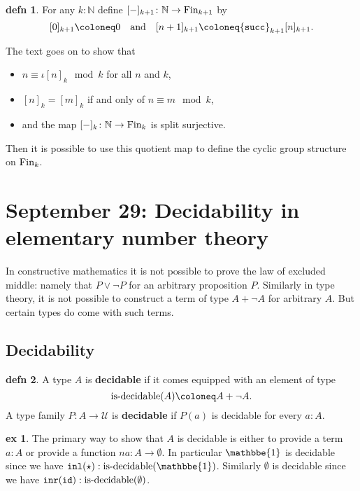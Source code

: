 \documentclass{amsart}
\theoremstyle{theorem}
\theoremstyle{definition}
\newtheorem*{defn}{defn}
\newtheorem*{ex}{ex}
\theoremstyle{remark}
\newcommand{\0}{\mathbbe{0}}
\newcommand{\1}{\mathbbe{1}}
\newcommand{\2}{\mathbbe{2}}
\newcommand{\3}{\mathbbe{3}}
\newcommand{\4}{\mathbbe{4}}
\newcommand{\term}[1]{{\textup{\texttt{#1}}}}
\newcommand{\type}[1]{{\textup{#1}}}
\newcommand{\id}{\term{id}}
\newcommand{\bN}{{\mathbb{N}}}
\newcommand{\inl}{\term{inl}}
\newcommand{\inr}{\term{inr}}
\newcommand{\UU}{{\mathcal{U}}}
\begin{document}
\begin{defn} For any $k : \bN$ define $[-]_{k+1} \colon \bN \to \type{Fin}_{k+1}$ by
\[ [0]_{k+1} \coloneq 0 \quad \text{and} \quad [n+1]_{k+1} \coloneq \term{succ}_{k+1}[n]_{k+1}.\]
\end{defn}

The text goes on to show that 
\begin{itemize}
\item $n \equiv \iota [n]_{k} \mod k$ for all $n$ and $k$,
\item $[n]_k = [m]_k$ if and only of $n \equiv m \mod k$,
\item and the map $[-]_k \colon \bN \to \type{Fin}_k$ is split surjective.
\end{itemize}

Then it is possible to use this quotient map to define the cyclic group structure on $\type{Fin}_k$.

\section*{September 29: Decidability in elementary number theory}

In constructive mathematics it is not possible to prove the law of excluded middle: namely that $P \vee \neg P$ for an arbitrary proposition $P$. Similarly in type theory, it is not possible to construct a term of type $A + \neg A$ for arbitrary $A$. But certain types do come with such terms.

\subsection*{Decidability}

\begin{defn} A type $A$ is \textbf{decidable} if it comes equipped with an element of type
\[ \type{is-decidable}(A) \coloneq A + \neg A.\]
A type family $P \colon A \to \UU$ is \textbf{decidable} if $P(a)$ is decidable for every $a : A$.
\end{defn}

\begin{ex}
The primary way to show that $A$ is decidable is either to provide a term $a : A$ or provide a function $na : A \to \emptyset$. In particular $\1$ is decidable since we have $\inl(\star) : \type{is-decidable}(\1)$. Similarly $\emptyset$ is decidable since we have $\inr(\id) : \type{is-decidable}(\emptyset)$.
\end{ex}
\end{document}
